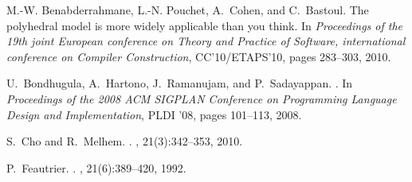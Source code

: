 \documentclass{sig-alternate}
\begin{document}
\begin{thebibliography}{10}                                                      
                                                                                 
M.-W. Benabderrahmane, L.-N. Pouchet, A.~Cohen, and C.~Bastoul.                  
\newblock The polyhedral model is more widely applicable than you think.         
\newblock In {\em Proceedings of the 19th joint European conference on Theory    
  and Practice of Software, international conference on Compiler Construction},  
  CC'10/ETAPS'10, pages 283--303, 2010.                                          
                                                                                 
U.~Bondhugula, A.~Hartono, J.~Ramanujam, and P.~Sadayappan.                      
.                                                                    
\newblock In {\em Proceedings of the 2008 ACM SIGPLAN Conference on Programming  
  Language Design and Implementation}, PLDI '08, pages 101--113, 2008.           
                                                                                 
S.~Cho and R.~Melhem.                                                            
.                                                                  
,          
  21(3):342--353, 2010.                                                          
                                                                                 
P.~Feautrier.                                                                    
.                                                        
, 21(6):389--420,   
  1992.                                                                          
                                                                                 

\end{thebibliography}
\end{document}
